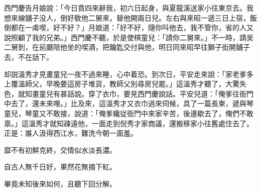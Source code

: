 西門慶告月娘說：「今日賁四來辭我，初六日起身，與夏龍溪送家小往東京去。我想來線舖子没人，倒好敎他二舅來，替他開兩日兒。左右與來昭一遞三日上宿，飯倒都在一䖏喫，好不好？」月娘道：「好不好，隨你呌他去，我不管你，省的人又說照顧了我的兄弟。」西門慶不聽，於是使棋童兒：「請你二舅來。」不一時，請吴二舅到，在前廳陪他坐的喫酒，把鑰匙交付與他，明日同來昭早往獅子街開舖子去，不在話下。

却説溫秀才見畫童兒一夜不過來睡，心中着恐。到次日，平安走來說：「家老爹多上覆溫師父，早晚要這房子堆貨，教師父別尋房兒罷。」這溫秀才聽了，大驚失色，就知畫童兒有甚話說。穿了衣巾，要見西門慶說話。平安兒道：「俺爹往衙門中去了，還未來哩。」比及來，這溫秀才又衣巾過來伺候，具了一篇長柬，遞與琴童兒，琴童又不敢接，說道：「俺爹纔従衙門中來家辛苦，後邊歇去了，俺們不敢禀。」這溫秀才就知疎遠他，一面走到倪秀才家商議，還搬移家小往舊處住去了。正是：誰人汲得西江水，難洗今朝一面羞。

\begin{myquote}
靡不有初鮮克終，交情似水淡長濃。

自古人無千日好，果然花無摘下紅。
\end{myquote}

畢竟未知後來如何，且聽下回分解。

